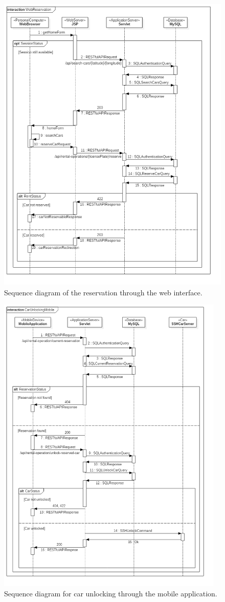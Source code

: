 \begin{figure}[H]
	\noindent
    	\centering
    	\includegraphics[height=550px, keepaspectratio]{diagrams/SequenceReservation.png}
	\caption{Sequence diagram of the reservation through the web interface.}
    	\label{fig:sequence-reservation}
\end{figure}

\begin{figure}[H]
	\noindent
    	\centering
    	\includegraphics[height=550px, keepaspectratio]{diagrams/SequenceCarUnlocking.png}
	\caption{Sequence diagram for car unlocking through the mobile application.}
    	\label{fig:sequence-unlocking}
\end{figure}


